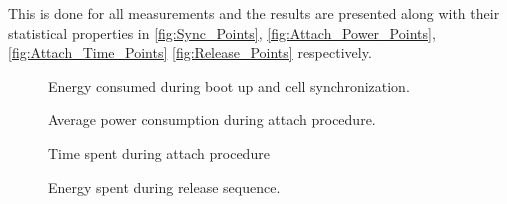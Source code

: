 This is done for all measurements and the results are presented along with their statistical properties in \autoref{fig:Sync_Points}, \autoref{fig:Attach_Power_Points}, \autoref{fig:Attach_Time_Points} \autoref{fig:Release_Points} respectively.

\begin{figure}[H]
\centering
\begin{minipage}{0.48\textwidth}
\resizebox{\textwidth}{!}{
}
\end{minipage}
\hfill
\begin{minipage}{0.48\textwidth}
\resizebox{\textwidth}{!}{
}
\end{minipage}
\caption{Energy consumed during boot up and cell synchronization.}
\label{fig:Sync_Points}
\end{figure}

\begin{figure}[H]
\centering
\begin{minipage}{0.48\textwidth}
\resizebox{\textwidth}{!}{
}
\end{minipage}
\hfill
\begin{minipage}{0.48\textwidth}
\resizebox{\textwidth}{!}{
}
\end{minipage}
\caption{Average power consumption during attach procedure.}
\label{fig:Attach_Power_Points}
\end{figure}

\begin{figure}[H]
\centering
\begin{minipage}{0.48\textwidth}
\resizebox{\textwidth}{!}{
}
\end{minipage}
\hfill
\begin{minipage}{0.48\textwidth}
\resizebox{\textwidth}{!}{
}
\end{minipage}
\caption{Time spent during attach procedure}
\label{fig:Attach_Time_Points}
\end{figure}

\begin{figure}[H]
\centering
\begin{minipage}{0.48\textwidth}
\resizebox{\textwidth}{!}{
}
\end{minipage}
\hfill
\begin{minipage}{0.48\textwidth}
\resizebox{\textwidth}{!}{
}
\end{minipage}
\caption{Energy spent during release sequence.}
\label{fig:Release_Points}
\end{figure}

